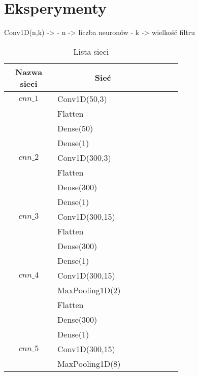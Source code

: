 \newpage %
\section{Eksperymenty}


Conv1D(n,k) ->
- n -> liczba neuronów
- k -> wielkość filtru

\begin{longtable}{| c | m{0.58\linewidth} | r | m{0.1\linewidth} |}
    \caption{Lista sieci}                       \\
    \hline
    Nazwa sieci & \multicolumn{1}{c|}{Sieć}     \\ \hline\hline \endfirsthead

    \endfoot
    \hline \endlastfoot



    $cnn\_1$    & Conv1D(50,3)                  \\
                & Flatten                       \\
                & Dense(50)                     \\
                & Dense(1)                      \\ \hline
    $cnn\_2$    & Conv1D(300,3)                 \\
                & Flatten                       \\
                & Dense(300)                    \\
                & Dense(1)                      \\ \hline
    $cnn\_3$    & Conv1D(300,15)                \\
                & Flatten                       \\
                & Dense(300)                    \\
                & Dense(1)                      \\ \hline
    $cnn\_4$    & Conv1D(300,15)                \\
                & MaxPooling1D(2)               \\
                & Flatten                       \\
                & Dense(300)                    \\
                & Dense(1)                      \\ \hline
    $cnn\_5$    & Conv1D(300,15)                \\
                & MaxPooling1D(8)               \\

\end{longtable}
